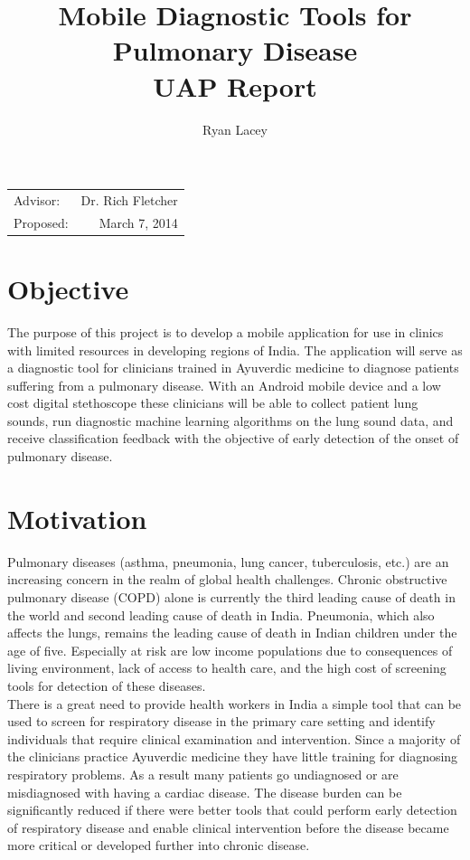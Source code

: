 \documentclass{article}
\title{Mobile Diagnostic Tools for Pulmonary Disease\\ UAP Report} %
\author{Ryan Lacey}
\date{}
\begin{document}
\maketitle %

\begin{center}
\begin{tabular}{l r}
Advisor: & Dr. Rich Fletcher \\
Proposed: & March 7, 2014 \\
\end{tabular}
\end{center}

\section{Objective}

The purpose of this project is to develop a mobile application for use in clinics with limited resources in developing regions of India. The application will serve as a diagnostic tool for clinicians trained in Ayuverdic medicine to diagnose patients suffering from a pulmonary disease. With an Android mobile device and a low cost digital stethoscope these clinicians will be able to collect patient lung sounds, run diagnostic machine learning algorithms on the lung sound data, and receive classification feedback with the objective of early detection of the onset of pulmonary disease.\\

\section{Motivation}

Pulmonary diseases (asthma, pneumonia, lung cancer, tuberculosis, etc.) are an increasing concern in the realm of global health challenges. Chronic obstructive pulmonary disease (COPD) alone is currently the third leading cause of death in the world and second leading cause of death in India. Pneumonia, which also affects the lungs, remains the leading cause of death in Indian children under the age of five. Especially at risk are low income populations due to consequences of living environment, lack of access to health care, and the high cost of screening tools for detection of these diseases.\\

There is a great need to provide health workers in India a simple tool that can be used to screen for respiratory disease in the primary care setting and identify individuals that require clinical examination and intervention. Since a majority of the clinicians practice Ayuverdic medicine they have little training for diagnosing respiratory problems. As a result many patients go undiagnosed or are misdiagnosed with having a cardiac disease. The disease burden can be significantly reduced if there were better tools that could perform early detection of respiratory disease and enable clinical intervention before the disease became more critical or developed further into chronic disease.\\
\end{document}
